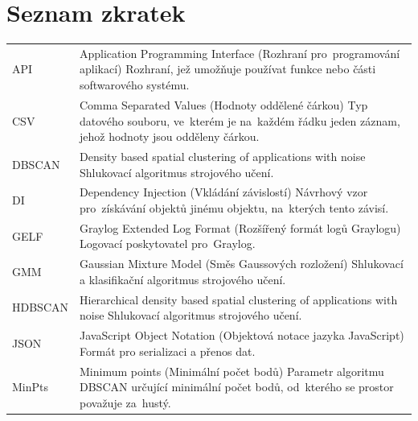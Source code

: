 \chapter{Seznam zkratek}
\label{priloha-B}

\renewcommand*{\arraystretch}{1.4}
\begin{longtable}{p{2cm}p{12.2cm}}
API & Application Programming Interface (Rozhraní pro~programování aplikací)\newline
Rozhraní, jež umožňuje používat funkce nebo části softwarového systému.\\

CSV & Comma Separated Values (Hodnoty oddělené čárkou)\newline
Typ datového souboru, ve~kterém je na~každém řádku jeden záznam, jehož hodnoty jsou odděleny čárkou.\\

DBSCAN & Density based spatial clustering of applications with noise\newline
Shlukovací algoritmus strojového učení.\\

DI & Dependency Injection (Vkládání závislostí)\newline
Návrhový vzor pro~získávání objektů jinému objektu, na~kterých tento závisí.\\

GELF & Graylog Extended Log Format (Rozšířený formát logů Graylogu)\newline
Logovací poskytovatel pro~Graylog.\\

GMM & Gaussian Mixture Model (Směs Gaussových rozložení)\newline
Shlukovací a klasifikační algoritmus strojového učení.\\

HDBSCAN & Hierarchical density based spatial clustering of applications with noise\newline
Shlukovací algoritmus strojového učení.\\

JSON & JavaScript Object Notation (Objektová notace jazyka JavaScript)\newline
Formát pro serializaci a přenos dat.\\

MinPts & Minimum points (Minimální počet bodů)\newline
Parametr algoritmu DBSCAN určující minimální počet bodů, od~kterého se prostor považuje za~hustý.\\


\end{longtable}
